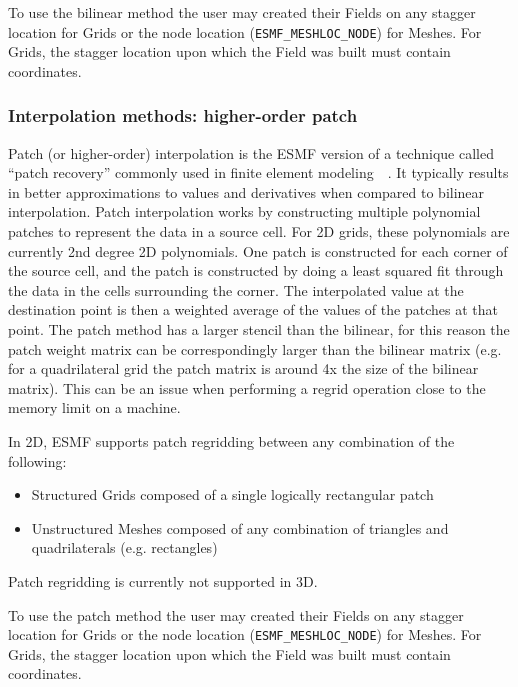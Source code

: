 \smallskip

 To use the bilinear method the user may created their Fields on any stagger location for Grids or the node location ({\tt ESMF\_MESHLOC\_NODE}) for Meshes.
 For Grids, the stagger location upon which the Field was built must contain coordinates. 

\subsubsection{Interpolation methods: higher-order patch}\label{sec:interpolation:patch}

 Patch (or higher-order) interpolation is the ESMF version of a technique called ``patch recovery'' commonly
 used in finite element modeling~\cite{PatchInterp1}~\cite{PatchInterp2}. It typically results in better approximations to 
 values and derivatives when compared to bilinear interpolation.
 Patch interpolation works by constructing multiple polynomial patches to represent
 the data in a source cell. For 2D grids, these polynomials
 are currently 2nd degree 2D polynomials. One patch is constructed for each corner of the source cell, and the patch is constructed 
 by doing a least squared fit through the data in the cells surrounding the corner. The interpolated value at the destination point is 
 then a weighted average of the values of the patches at that point. The patch method has a larger
 stencil than the bilinear, for this reason the patch weight matrix can be correspondingly larger
 than the bilinear matrix (e.g. for a quadrilateral grid the patch matrix is around 4x the size of
 the bilinear matrix). This can be an issue when performing a regrid operation close to the memory
 limit on a machine.  

\smallskip

 In 2D, ESMF supports patch regridding between any combination of the following:
 \begin{itemize}
 \item Structured Grids composed of a single logically rectangular patch
 \item Unstructured Meshes composed of any combination of triangles and quadrilaterals (e.g. rectangles)
 \end{itemize}

\smallskip

 Patch regridding is currently not supported in 3D.

\smallskip

 To use the patch method the user may created their Fields on any stagger location for Grids or the node location ({\tt ESMF\_MESHLOC\_NODE}) for Meshes.
 For Grids, the stagger location upon which the Field was built must contain coordinates. 


